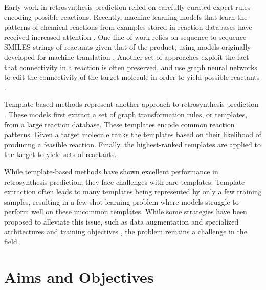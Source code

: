 Early work in retrosynthesis prediction relied on carefully curated expert rules  encoding
possible reactions. Recently, machine learning models that learn the patterns of chemical reactions
from examples stored in reaction databases have received increased attention
\citep{coleyMachineLearningComputerAided2018}. One line of work relies on sequence-to-sequence
SMILES strings of reactants given that of the product, using models
originally developed for machine translation
\citep{schwallerMolecularTransformerModel2019,namLinkingNeuralMachine2016,schwallerFoundTranslationPredicting2018,karpovTransformerModelRetrosynthesis2019,tetkoStateoftheartAugmentedNLP2020}.
Another set of approaches exploit the fact that connectivity in a reaction is often preserved, and
use graph neural networks to edit the connectivity of the target molecule in order to yield possible
reactants \citep{sachaMoleculeEditGraph2020,shiGraphGraphsFramework2020,somnathLearningGraphModels2020,yanRetroXpertDecomposeRetrosynthesis2020}.

Template-based methods represent another approach to retrosynthesis prediction
\citep{seglerNeuralSymbolicMachineLearning2017,seglerPlanningChemicalSyntheses2018,daiRetrosynthesisPredictionConditional2020,sunEnergybasedViewRetrosynthesis2020}.
These models first extract a set of graph transformation rules, or templates, from a large reaction
database. These templates encode common reaction patterns. Given a target molecule ranks the
templates based on their likelihood of producing a feasible reaction. Finally, the highest-ranked
templates are applied to the target to yield sets of reactants.

While template-based methods have shown excellent performance in retrosynthesis prediction, they
face challenges with rare templates. Template extraction often leads to many templates being
represented by only a few training samples, resulting in a few-shot learning problem where models
struggle to perform well on these uncommon templates. While some strategies have been proposed
to alleviate this issue, such as data augmentation \citep{fortunatoDataAugmentationPretraining2020}
and specialized architectures and training objectives
\citep{daiRetrosynthesisPredictionConditional2020}, the problem remains a challenge in the field.

\section{Aims and Objectives\label{sec:aims-objectives}}
